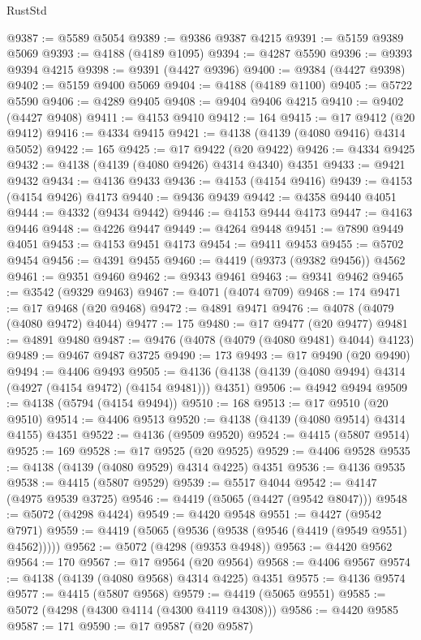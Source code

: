 \begin{lexlean}{RustStd}
\begin{coremodule}
@9387 := @5589 @5054
@9389 := @9386 @9387 @4215
@9391 := @5159 @9389 @5069
@9393 := @4188 (@4189 @1095)
@9394 := @4287 @5590
@9396 := @9393 @9394 @4215
@9398 := @9391 (@4427 @9396)
@9400 := @9384 (@4427 @9398)
@9402 := @5159 @9400 @5069
@9404 := @4188 (@4189 @1100)
@9405 := @5722 @5590
@9406 := @4289 @9405
@9408 := @9404 @9406 @4215
@9410 := @9402 (@4427 @9408)
@9411 := @4153 @9410
@9412 := 164
@9415 := @17 @9412 (@20 @9412)
@9416 := @4334 @9415
@9421 := @4138 (@4139 (@4080 @9416) @4314 @5052)
@9422 := 165
@9425 := @17 @9422 (@20 @9422)
@9426 := @4334 @9425
@9432 := @4138 (@4139 (@4080 @9426) @4314 @4340) @4351
@9433 := @9421 @9432
@9434 := @4136 @9433
@9436 := @4153 (@4154 @9416)
@9439 := @4153 (@4154 @9426) @4173
@9440 := @9436 @9439
@9442 := @4358 @9440 @4051
@9444 := @4332 (@9434 @9442)
@9446 := @4153 @9444 @4173
@9447 := @4163 @9446
@9448 := @4226 @9447
@9449 := @4264 @9448
@9451 := @7890 @9449 @4051
@9453 := @4153 @9451 @4173
@9454 := @9411 @9453
@9455 := @5702 @9454
@9456 := @4391 @9455
@9460 := @4419 (@9373 (@9382 @9456)) @4562
@9461 := @9351 @9460
@9462 := @9343 @9461
@9463 := @9341 @9462
@9465 := @3542 (@9329 @9463)
@9467 := @4071 (@4074 @709)
@9468 := 174
@9471 := @17 @9468 (@20 @9468)
@9472 := @4891 @9471
@9476 := @4078 (@4079 (@4080 @9472) @4044)
@9477 := 175
@9480 := @17 @9477 (@20 @9477)
@9481 := @4891 @9480
@9487 := @9476 (@4078 (@4079 (@4080 @9481) @4044) @4123)
@9489 := @9467 @9487 @3725
@9490 := 173
@9493 := @17 @9490 (@20 @9490)
@9494 := @4406 @9493
@9505 := @4136 (@4138 (@4139 (@4080 @9494) @4314 (@4927 (@4154 @9472) (@4154 @9481))) @4351)
@9506 := @4942 @9494
@9509 := @4138 (@5794 (@4154 @9494))
@9510 := 168
@9513 := @17 @9510 (@20 @9510)
@9514 := @4406 @9513
@9520 := @4138 (@4139 (@4080 @9514) @4314 @4155) @4351
@9522 := @4136 (@9509 @9520)
@9524 := @4415 (@5807 @9514)
@9525 := 169
@9528 := @17 @9525 (@20 @9525)
@9529 := @4406 @9528
@9535 := @4138 (@4139 (@4080 @9529) @4314 @4225) @4351
@9536 := @4136 @9535
@9538 := @4415 (@5807 @9529)
@9539 := @5517 @4044
@9542 := @4147 (@4975 @9539 @3725)
@9546 := @4419 (@5065 (@4427 (@9542 @8047)))
@9548 := @5072 (@4298 @4424)
@9549 := @4420 @9548
@9551 := @4427 (@9542 @7971)
@9559 := @4419 (@5065 (@9536 (@9538 (@9546 (@4419 (@9549 @9551) @4562)))))
@9562 := @5072 (@4298 (@9353 @4948))
@9563 := @4420 @9562
@9564 := 170
@9567 := @17 @9564 (@20 @9564)
@9568 := @4406 @9567
@9574 := @4138 (@4139 (@4080 @9568) @4314 @4225) @4351
@9575 := @4136 @9574
@9577 := @4415 (@5807 @9568)
@9579 := @4419 (@5065 @9551)
@9585 := @5072 (@4298 (@4300 @4114 (@4300 @4119 @4308)))
@9586 := @4420 @9585
@9587 := 171
@9590 := @17 @9587 (@20 @9587)

\end{coremodule}
\end{lexlean}
